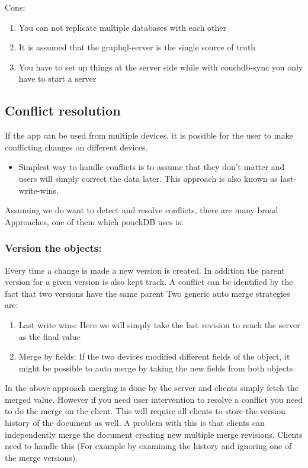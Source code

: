 Cons:
\begin{enumerate}
    \item You can not replicate multiple databases with each other
    \item It is assumed that the graphql-server is the single source of truth
    \item You have to set up things at the server side while with couchdb-sync you only have to start a server
\end{enumerate}


\subsection{Conflict resolution}
If the app can be used from multiple devices, it is possible for the user to make conflicting changes on different devices.

\begin{itemize}
    \item Simplest way to handle conflicts is to assume that they don’t matter and users will simply correct the data later. This approach is also known as last-write-wins.
\end{itemize}

Assuming we do want to detect and resolve conflicts, there are many broad
Approaches, one of them which pouchDB uses is:

\subsubsection{Version the objects:}

Every time a change is made a new version is created. In addition the parent version for a given version is also kept track. A conflict can be identified by the fact that two versions have the same parent
Two generic auto merge strategies are:

\begin{enumerate}
    \item Last write wins: Here we will simply take the last revision to reach the server as the final value
    \item Merge by fields: If the two devices modified different fields of the object, it might be possible to auto merge by taking the new fields from both objects
\end{enumerate}

In the above approach merging is done by the server and clients simply fetch the merged value. 
However if you need user intervention to resolve a conflict you need to do the merge on the client.
This will require all clients to store the version history of the document as well. A problem with this 
is that clients can independently merge the document creating new multiple merge revisions.
Clients need to handle this (For example by examining the history and ignoring one of the merge versions).

